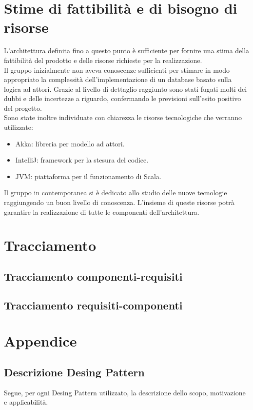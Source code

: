 \documentclass[a4paper]{article}
\begin{document}
	\newpage 
	\section{Stime di fattibilità e di bisogno di risorse}
	
		L'architettura definita fino a questo punto è sufficiente per fornire una stima della fattibilità del prodotto e delle risorse richieste per la realizzazione. \\
	Il gruppo inizialmente non aveva conoscenze sufficienti per stimare in modo appropriato la complessità dell'implementazione di un database basato sulla logica ad attori. Grazie al livello di dettaglio raggiunto sono stati fugati molti dei dubbi e delle incertezze a riguardo, confermando le previsioni sull'esito positivo del progetto. \\
	Sono state inoltre individuate con chiarezza le risorse tecnologiche che verranno utilizzate:
	\begin{itemize}
		\item Akka: libreria per modello ad attori.
		\item IntelliJ: framework per la stesura del codice.
		\item JVM: piattaforma per il funzionamento di Scala.
	\end{itemize}
	Il gruppo in contemporanea si è dedicato allo studio delle nuove tecnologie raggiungendo un buon livello di conoscenza. L'insieme di queste risorse potrà garantire la realizzazione di tutte le componenti dell'architettura.
	
	\newpage 
	\section{Tracciamento}
		\subsection{Tracciamento componenti-requisiti}
		\subsection{Tracciamento requisiti-componenti}
		
	\newpage 
	\section{Appendice}
	\subsection{Descrizione Desing Pattern}
	Segue, per ogni Desing Pattern utilizzato, la descrizione dello scopo, motivazione e applicabilità.
\end{document}
